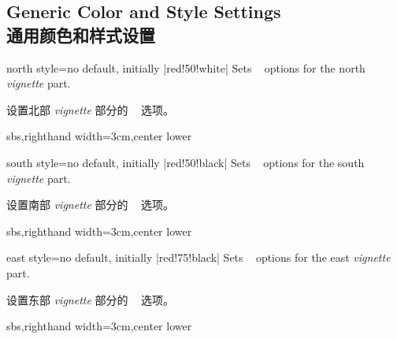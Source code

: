 \subsection{Generic Color and Style Settings\\通用颜色和样式设置}\label{subsec:vignettestyle}

\begin{vigTcbKey}[][doc new=2016-04-22]{north style}{=}{no default, initially |red!50!white|}
Sets \tikzname\  options for the north \emph{vignette} part.

设置北部 \emph{vignette} 部分的 \tikzname\  选项。
\begin{dispExample*}{sbs,righthand width=3cm,center lower}
\end{dispExample*}
\end{vigTcbKey}

\begin{vigTcbKey}[][doc new=2016-04-22]{south style}{=}{no default, initially |red!50!black|}
Sets \tikzname\  options for the south \emph{vignette} part.

设置南部 \emph{vignette} 部分的 \tikzname\  选项。
\begin{dispExample*}{sbs,righthand width=3cm,center lower}
\end{dispExample*}
\end{vigTcbKey}


\begin{vigTcbKey}[][doc new=2016-04-22]{east style}{=}{no default, initially |red!75!black|}
Sets \tikzname\  options for the east \emph{vignette} part.

设置东部 \emph{vignette} 部分的 \tikzname\  选项。
\begin{dispExample*}{sbs,righthand width=3cm,center lower}
\end{dispExample*}
\end{vigTcbKey}


